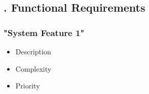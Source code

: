 \subsection{. Functional Requirements}
	\subsubsection{ "System Feature 1"}
	\begin{itemize}
		\item  Description
		\item  Complexity
		\item  Priority
	\end{itemize}
